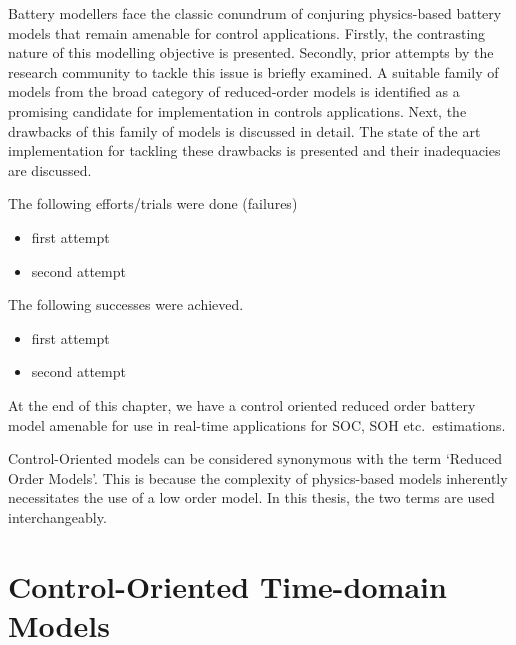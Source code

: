 



\graphicspath{{4/figures/}}

Battery modellers face the classic conundrum of conjuring physics-based battery models that remain
amenable for control applications. Firstly, the contrasting nature of this modelling objective is
presented. Secondly, prior attempts by the research community to tackle this issue is briefly
examined. A suitable family of models from the broad category of reduced-order models is identified
as a promising candidate for implementation in controls applications. Next, the drawbacks of this
family of models is discussed in detail. The state of the art implementation for tackling these
drawbacks is presented and their inadequacies are discussed.

The following efforts/trials were done (failures)
\begin{itemize}
    \item first attempt
    \item second attempt
\end{itemize}
The following successes were achieved.
\begin{itemize}
    \item first attempt
    \item second attempt
\end{itemize}

At the end of this chapter, we have a control oriented reduced order battery model amenable for use
in real-time applications for SOC, SOH etc.\ estimations.

Control-Oriented models can be considered synonymous with the term `Reduced Order Models'. This is
because the complexity of physics-based models inherently necessitates the use of a low order model.
In this thesis, the two terms are used interchangeably.

\section{Control-Oriented Time-domain Models}

